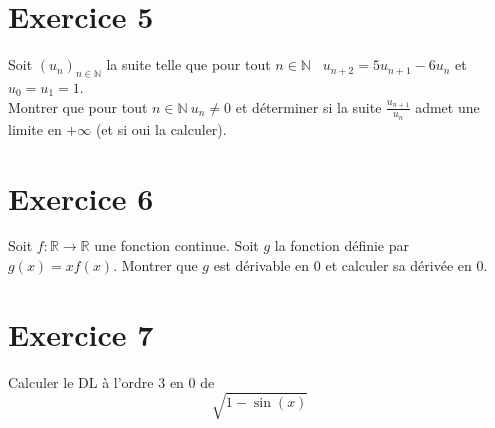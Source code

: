 \documentclass{article}
\begin{document}
\section*{Exercice 5}
Soit $(u_n)_{n \in \mathbb{N} }$ la suite telle que pour tout $n\in \mathbb{N}$ \ $u_{n+2}=5u_{n+1}-6u_n$ et $u_0=u_1=1$.\\
Montrer que pour tout $n\in \mathbb{N} \ u_n \neq 0$ et d{\'e}terminer si
la suite $\frac{u_{n+1}}{u_n}$ admet une limite en $ + \infty$ (et si oui la calculer).

\section*{Exercice 6}
Soit $f : \mathbb{R} \rightarrow \mathbb{R} $ une fonction continue. Soit $g$ la fonction d{\'e}finie par $g(x) = xf(x)$. Montrer que $g$ est d{\'e}rivable en $0$ et calculer sa d{\'e}riv{\'e}e en $0$.

\section*{Exercice 7}
Calculer le DL {\`a} l'ordre 3 en 0 de 
$$\sqrt{1 - \sin(x)}$$






\end{document}
